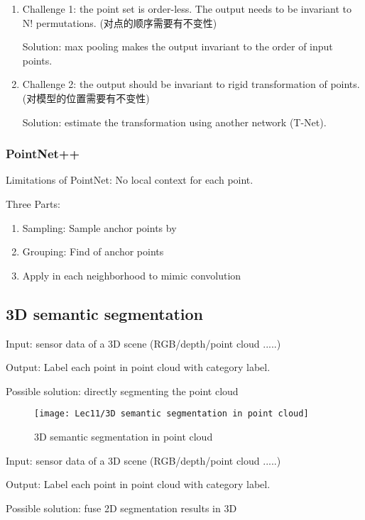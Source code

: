 \begin{enumerate}
    \item Challenge 1: the point set is order-less. The output needs to be invariant to N! permutations. (对点的顺序需要有不变性)
    
    Solution: max pooling makes the output invariant to the order of input points. 
    \item Challenge 2: the output should be invariant to rigid transformation of points. (对模型的位置需要有不变性)
    
    Solution: estimate the transformation using another network (T-Net). 
\end{enumerate}

\subsubsection{PointNet++}
Limitations of PointNet: No local context for each point. 

Three Parts: 
\begin{enumerate}
    \item Sampling: Sample anchor points by 
    \item Grouping: Find  of anchor points
    \item Apply  in each neighborhood to mimic convolution
\end{enumerate}

\subsection{3D semantic segmentation}

Input: sensor data of a 3D scene (RGB/depth/point cloud .....)

Output: Label each point in point cloud with category label.

Possible solution: directly segmenting the point cloud

\begin{figure}[H]
    \centering
    \texttt{[image: Lec11/3D semantic segmentation in point cloud]}
    \caption{3D semantic segmentation in point cloud}
\end{figure}

Input: sensor data of a 3D scene (RGB/depth/point cloud .....)

Output: Label each point in point cloud with category label.

Possible solution: fuse 2D segmentation results in 3D

